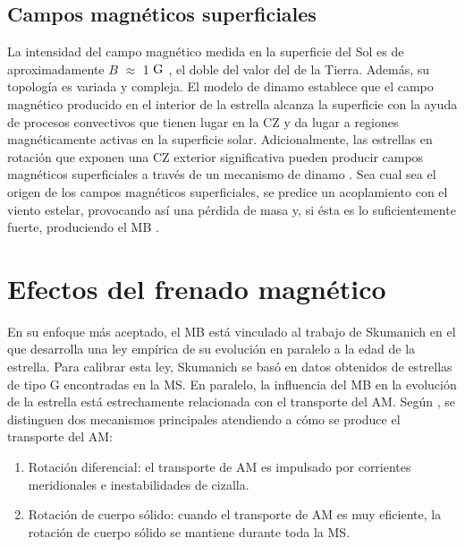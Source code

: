 \subsection{Campos magnéticos superficiales} \label{surf_mf}
La intensidad del campo magnético medida en la superficie del Sol es de aproximadamente $B$ $\approx$ 1 $\mathrm{G}$ \citep{Weber1967,DAntona2000,Morin2012}, el doble del valor del de la Tierra. Además, su topología es variada y compleja. El modelo de dinamo establece que el campo magnético producido en el interior de la estrella alcanza la superficie con la ayuda de procesos convectivos que tienen lugar en la CZ y da lugar a regiones magnéticamente activas en la superficie solar. Adicionalmente, las estrellas en rotación que exponen una CZ exterior significativa pueden producir campos magnéticos superficiales a través de un mecanismo de dinamo \citep{Brandenburg2004,Charbonneau2010,Brun2017}. Sea cual sea el origen de los campos magnéticos superficiales, se predice un acoplamiento con el viento estelar, provocando así una pérdida de masa y, si ésta es lo suficientemente fuerte, produciendo el MB \citep{UdDoula2002,Ud-Doula2007,Ud-Doula2008,Meynet2010}.\par



\section{Efectos del frenado magnético}
En su enfoque más aceptado, el MB está vinculado al trabajo de Skumanich \citep{Skumanich1972} en el que desarrolla una ley empírica de su evolución en paralelo a la edad de la estrella. Para calibrar esta ley, Skumanich se basó en datos obtenidos de estrellas de tipo G encontradas en la MS. En paralelo, la influencia del MB en la evolución de la estrella está estrechamente relacionada con el transporte del AM. Según \cite{Meynet2010}, se distinguen dos mecanismos principales atendiendo a cómo se produce el transporte del AM:

\begin{enumerate}
    \item Rotación diferencial: el transporte de AM es impulsado por corrientes meridionales e inestabilidades de cizalla.
    \item Rotación de cuerpo sólido: cuando el transporte de AM es muy eficiente, la rotación de cuerpo sólido se mantiene durante toda la MS.
\end{enumerate}


